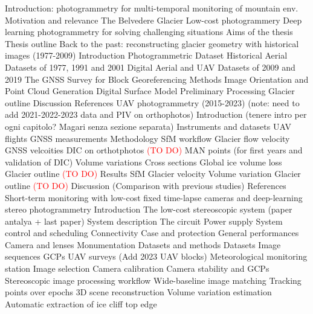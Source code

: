 \documentclass[12pt]{article}
\begin{document}
\begin{outline}[enumerate]
    \1 Introduction: photogrammetry for multi-temporal monitoring of mountain env.
    \2 Motivation and relevance
    \2 The Belvedere Glacier
    \2 Low-cost photogrammery
    \2 Deep learning photogrammetry for solving challenging situations
    \2 Aims of the thesis
    \2 Thesis outline
    \1 Back to the past: reconstructing glacier geometry with historical images
    (1977-2009)
    \2 Introduction
    \2 Photogrammetric Dataset
    \3 Historical Aerial Datasets of 1977, 1991 and 2001
    \3 Digital Aerial and UAV Datasets of 2009 and 2019
    \3 The GNSS Survey for Block Georeferencing
    \2 Methods
    \3 Image Orientation and Point Cloud Generation
    \3 Digital Surface Model Preliminary Processing
    \3 Glacier outline
    \2 Discussion
    \2 References
    \1 UAV photogrammetry (2015-2023) {\color{red} (note: need to add 2021-2022-2023 data
            and PIV on orthophotos)}
    \2 Introduction {\color{red}(tenere intro per ogni capitolo? Magari senza sezione
            separata)}
    \2 Instruments and datasets
    \3 UAV flights
    \3 GNSS measurements
    \2 Methodology
    \3 SfM workflow
    \3 Glacier flow velocity
    \4 GNSS velcoities
    \4 DIC on orthotphotos \textcolor{red}{(TO DO)}
    \4 MAN points (for first years and validation of DIC)
    \3 Volume variations
    \4 Cross sections
    \4 Global ice volume loss
    \3 Glacier outline \textcolor{red}{(TO DO)}
    \2 Results
    \3 SfM
    \3 Glacier velocity
    \3 Volume variation
    \3 Glacier outline \textcolor{red}{(TO DO)}
    \2 Discussion (Comparison with previous studies)
    \2 References
    \1 Short-term monitoring with low-cost fixed time-lapse cameras and deep-learning
    stereo photogrammetry
    \2 Introduction
    \2 The low-cost stereoscopic system {\color{red} (paper antalya + last paper)}
    \3 System description
    \4 The circuit
    \4 Power supply
    \4 System control and scheduling
    \4 Connectivity
    \4 Case and protection
    \4 General performances
    \3 Camera and lenses
    \3 Monumentation
    \2 Datasets and methods
    \3 Datasets
    \4 Image sequences
    \4 GCPs
    \4 UAV surveys	{\color{red} (Add 2023 UAV blocks)}
    \4 Meteorological monitoring station
    \3 Image selection
    \3 Camera calibration
    \3 Camera stability and GCPs
    \3 Stereoscopic image processing workflow
    \4 Wide-baseline image matching
    \4 Tracking points over epochs
    \4 3D scene reconstruction
    \3 Volume variation estimation
    \3 Automatic extraction of ice cliff top edge

\end{outline}
\end{document}

